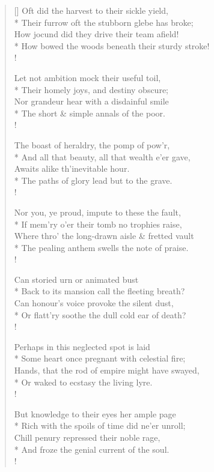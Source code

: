 \documentclass[MAIN]{subfiles}
\begin{document}
\begin{verse}[\versewidth]
Oft did the harvest to their sickle yield,\\*
Their furrow oft the stubborn glebe has broke;\\
How jocund did they drive their team afield!\\*
How bowed the woods beneath their sturdy stroke!\\!

Let not ambition mock their useful toil,\\*
Their homely joys, and destiny obscure;\\
Nor grandeur hear with a disdainful smile\\*
The short \& simple annals of the poor.\\!

The boast of heraldry, the pomp of pow'r,\\*
And all that beauty, all that wealth e'er gave,\\
Awaits alike th'inevitable hour.\\*
The paths of glory lead but to the grave.\\!

Nor you, ye proud, impute to these the fault,\\*
If mem'ry o'er their tomb no trophies raise,\\
Where thro' the long-drawn aisle \& fretted vault\\*
The pealing anthem swells the note of praise.\\!

Can storied urn or animated bust\\*
Back to its mansion call the fleeting breath?\\
Can honour's voice provoke the silent dust,\\*
Or flatt'ry soothe the dull cold ear of death?\\!

Perhaps in this neglected spot is laid\\*
Some heart once pregnant with celestial fire;\\
Hands, that the rod of empire might have swayed,\\*
Or waked to ecstasy the living lyre.\\!

But knowledge to their eyes her ample page\\*
Rich with the spoils of time did ne'er unroll;\\
Chill penury repressed their noble rage,\\*
And froze the genial current of the soul.\\!


\end{verse}
\end{document}
